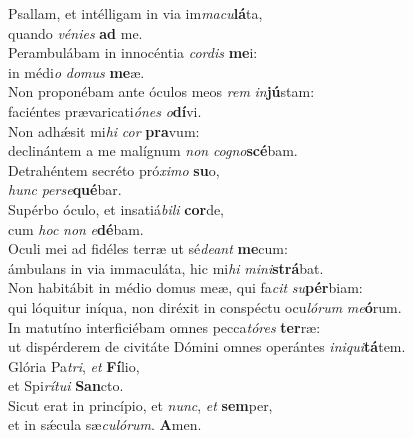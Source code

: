 \evenverse Psallam, et intélligam in via im\textit{ma}\textit{cu}\textbf{lá}ta,~\*\\
\evenverse quando \textit{vé}\textit{ni}\textit{es} \textbf{ad} me.\\
\oddverse Perambulábam in innocéntia \textit{cor}\textit{dis} \textbf{me}i:~\*\\
\oddverse in médi\textit{o} \textit{do}\textit{mus} \textbf{me}æ.\\
\evenverse Non proponébam ante óculos meos \textit{rem} \textit{in}\textbf{jú}stam:~\*\\
\evenverse faciéntes prævaricati\textit{ó}\textit{nes} \textit{o}\textbf{dí}vi.\\
\oddverse Non adhǽsit mi\textit{hi} \textit{cor} \textbf{pra}vum:~\*\\
\oddverse declinántem a me malígnum \textit{non} \textit{co}\textit{gno}\textbf{scé}bam.\\
\evenverse Detrahéntem secréto pró\textit{xi}\textit{mo} \textbf{su}o,~\*\\
\evenverse \textit{hunc} \textit{per}\textit{se}\textbf{qué}bar.\\
\oddverse Supérbo óculo, et insatiá\textit{bi}\textit{li} \textbf{cor}de,~\*\\
\oddverse cum \textit{hoc} \textit{non} \textit{e}\textbf{dé}bam.\\
\evenverse Oculi mei ad fidéles terræ ut sé\textit{de}\textit{ant} \textbf{me}cum:~\*\\
\evenverse ámbulans in via immaculáta, hic mi\textit{hi} \textit{mi}\textit{ni}\textbf{strá}bat.\\
\oddverse Non habitábit in médio domus meæ, qui fa\textit{cit} \textit{su}\textbf{pér}biam:~\*\\
\oddverse qui lóquitur iníqua, non diréxit in conspéctu ocu\textit{ló}\textit{rum} \textit{me}\textbf{ó}rum.\\
\evenverse In matutíno interficiébam omnes pecca\textit{tó}\textit{res} \textbf{ter}ræ:~\*\\
\evenverse ut dispérderem de civitáte Dómini omnes operántes \textit{i}\textit{ni}\textit{qui}\textbf{tá}tem.\\
\oddverse Glória Pa\textit{tri}, \textit{et} \textbf{Fí}lio,~\*\\
\oddverse et Spi\textit{rí}\textit{tu}\textit{i} \textbf{San}cto.\\
\evenverse Sicut erat in princípio, et \textit{nunc}, \textit{et} \textbf{sem}per,~\*\\
\evenverse et in sǽcula sæ\textit{cu}\textit{ló}\textit{rum}. \textbf{A}men.\\
